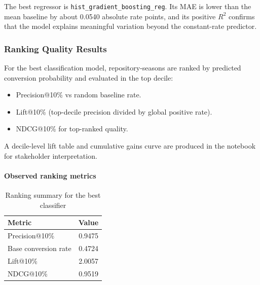 The best regressor is \texttt{hist\_gradient\_boosting\_reg}. Its MAE is lower than the mean baseline by about 0.0540 absolute rate points, and its positive $R^2$ confirms that the model explains meaningful variation beyond the constant-rate predictor.

\subsubsection{Ranking Quality Results}

For the best classification model, repository-seasons are ranked by predicted conversion probability and evaluated in the top decile:
\begin{itemize}
    \item Precision@10\% vs random baseline rate.
    \item Lift@10\% (top-decile precision divided by global positive rate).
    \item NDCG@10\% for top-ranked quality.
\end{itemize}

A decile-level lift table and cumulative gains curve are produced in the notebook for stakeholder interpretation.

\paragraph{Observed ranking metrics}
\begin{table}[H]
\centering
\begin{tabular}{lr}
\hline
Metric & Value \\
\hline
Precision@10\% & 0.9475 \\
Base conversion rate & 0.4724 \\
Lift@10\% & 2.0057 \\
NDCG@10\% & 0.9519 \\
\hline
\end{tabular}
\caption{Ranking summary for the best classifier}
\label{tab:modeling_ranking_summary}
\end{table}

